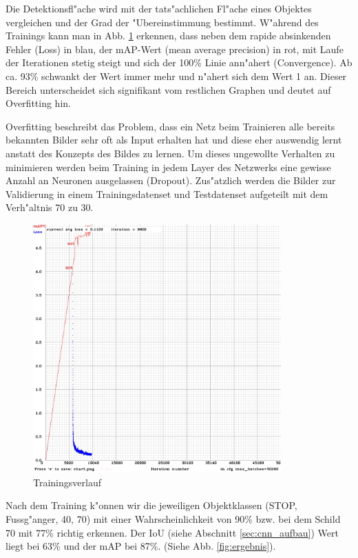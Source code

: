 Die Detektionsfl"ache wird mit der tats"achlichen Fl"ache eines Objektes vergleichen und der Grad der "Ubereinstimmung bestimmt. W"ahrend des Trainings kann man in Abb. \ref{fig:training} erkennen, dass neben dem rapide absinkenden Fehler (Loss) in blau, der mAP-Wert (mean average precision) in rot, mit Laufe der Iterationen stetig steigt und sich der 100\% Linie ann"ahert (Convergence). Ab ca. 93\% schwankt der Wert immer mehr und n"ahert sich dem Wert 1 an. Dieser Bereich unterscheidet sich signifikant vom restlichen Graphen und deutet auf Overfitting hin.

Overfitting beschreibt das Problem, dass ein Netz beim Trainieren alle bereits bekannten Bilder sehr oft als Input erhalten hat und diese eher auswendig lernt anstatt des Konzepts des Bildes zu lernen. Um dieses ungewollte Verhalten zu minimieren werden beim Training in jedem Layer des Netzwerks eine gewisse Anzahl an Neuronen ausgelassen (Dropout). Zus"atzlich werden die Bilder zur Validierung in einem Trainingsdatenset und Testdatenset aufgeteilt mit dem Verh"altnis 70 zu 30.

\begin{figure}[h]
	\centering
	\includegraphics[width=0.85\textwidth]{images/training}
	\caption{Trainingsverlauf}
	\label{fig:training}
\end{figure}

Nach dem Training k"onnen wir die jeweiligen Objektklassen (STOP, Fussg"anger, 40, 70) mit einer Wahrscheinlichkeit von 90\% bzw. bei dem Schild 70 mit 77\% richtig erkennen. Der IoU (siehe Abschnitt \ref{sec:cnn_aufbau}) Wert liegt bei 63\% und der mAP bei 87\%. (Siehe Abb. \ref{fig:ergebnis}).

